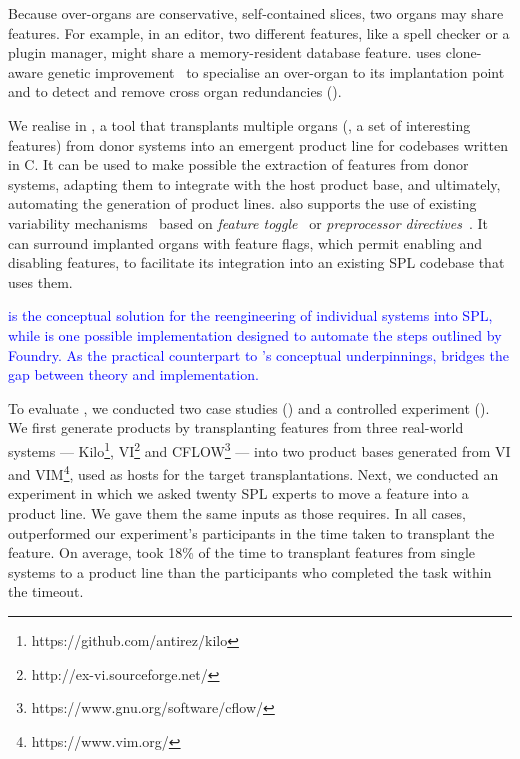 Because over-organs are conservative, self-contained slices, two organs may share features. For example, in an editor, two different features, like a spell checker or a plugin manager, might share a memory-resident database feature. \FOUNDRY uses clone-aware genetic improvement~\cite{Petke18} to specialise an over-organ to its implantation point and to detect and remove cross organ redundancies ().

We realise \FOUNDRY in \prodscalpel, a tool that transplants multiple organs (\ie, a set of interesting features) from donor systems into an emergent product line for codebases written in C. It can be used to make possible the extraction of features from donor systems, adapting them to integrate with the host product base, and ultimately, automating the generation of product lines. \prodscalpel also supports the use of existing variability mechanisms~\cite{Gacek2001} based on \emph{feature toggle}~\cite{Rahman2016} or \emph{preprocessor directives}~\cite{Kastner2008B}. It can surround implanted organs with feature flags, which permit enabling and disabling features, to facilitate its integration into an existing SPL codebase that uses them. 

\textcolor{blue}{\FOUNDRY is the conceptual solution for the reengineering of individual systems into SPL, while \prodScalpel is one possible implementation designed to automate the steps outlined by Foundry. As the practical counterpart to \FOUNDRY's conceptual underpinnings, \prodscalpel bridges the gap between theory and implementation.} 

To evaluate \prodscalpel, we conducted two case studies () and a controlled experiment (). We first generate products by transplanting features from three real-world systems ---  Kilo\footnote{https://github.com/antirez/kilo}, VI\footnote{http://ex-vi.sourceforge.net/} and CFLOW\footnote{https://www.gnu.org/software/cflow/} --- into two product bases generated from VI and VIM\footnote{https://www.vim.org/}, used as hosts for the target transplantations. Next, we conducted an experiment in which we asked twenty SPL experts to move a feature into a product line. 
We gave them the same inputs as those \prodscalpel requires. In all cases, \prodscalpel outperformed our experiment's participants in the time taken to transplant the feature.
On average, \prodscalpel took 18\% of the time to transplant features from single systems to a product line than the participants who completed the task within the timeout.


